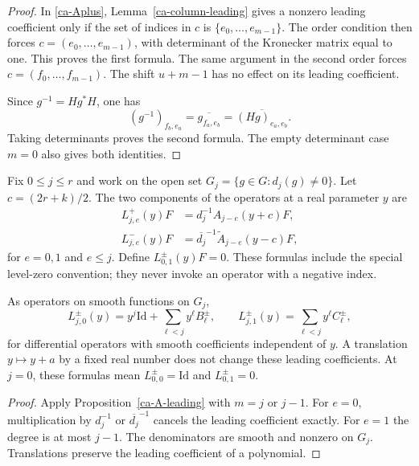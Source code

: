 \begin{proof}
In \eqref{ca-Aplus}, Lemma~\ref{ca-column-leading} gives a
nonzero leading coefficient only if the set of indices in
$c$ is $\{e_0,\ldots,e_{m-1}\}$.  The order condition then
forces $c=(e_0,\ldots,e_{m-1})$, with determinant of the
Kronecker matrix equal to one.  This proves the first formula.
The same argument in the second order forces
$c=(f_0,\ldots,f_{m-1})$.  The shift $u+m-1$ has no effect
on its leading coefficient.

Since $g^{-1}=Hg^*H$, one has
\[
 (g^{-1})_{f_b,e_a}
     =\overline{g_{f_a,e_b}}
     =\overline{(Hg)_{e_a,e_b}}.
\]
Taking determinants proves the second formula.  The empty
determinant case $m=0$ also gives both identities.
\end{proof}

Fix $0\leq j\leq r$ and work on the open set
$G_j=\{g\in G:d_j(g)\ne0\}$.
Let $c=(2r+k)/2$.  The two components of the operators
at a real parameter $y$ are
\begin{align}
 L^+_{j,e}(y)F&=d_j^{-1}A_{j-e}(y+c)F,
                    \label{ca-Lplus}\\
 L^-_{j,e}(y)F&=\overline{d_j}^{-1}
                       \widetilde A_{j-e}(y-c)F,
                    \label{ca-Lminus}
\end{align}
for $e=0,1$ and $e\leq j$.  Define
$L^\pm_{0,1}(y)F=0$.
These formulas include the special level-zero convention;
they never invoke an operator with a negative index.

\begin{corollary}\label{ca-normalized-leading}
As operators on smooth functions on $G_j$,
\[
 L^\pm_{j,0}(y)=y^j\mathrm{Id}
                       +\sum_{\ell<j}y^\ell B^\pm_\ell,\qquad
 L^\pm_{j,1}(y)=\sum_{\ell<j}y^\ell C^\pm_\ell,
\]
for differential operators with smooth coefficients independent
of $y$.  A translation $y\mapsto y+a$ by a fixed real number
does not change these leading coefficients.
At $j=0$, these formulas mean
$L^\pm_{0,0}=\mathrm{Id}$ and $L^\pm_{0,1}=0$.
\end{corollary}

\begin{proof}
Apply Proposition~\ref{ca-A-leading} with $m=j$ or $j-1$.
For $e=0$, multiplication by $d_j^{-1}$ or
$\overline{d_j}^{-1}$ cancels the leading coefficient
exactly.  For $e=1$ the degree is at most $j-1$.
The denominators are smooth and nonzero on $G_j$.
Translations preserve the leading coefficient of a polynomial.
\end{proof}

